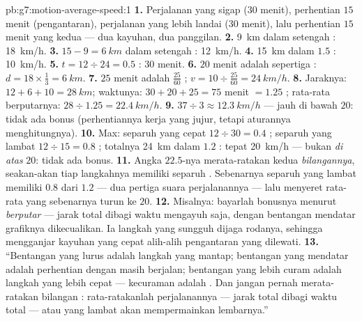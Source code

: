 \begin{solution}{pb:g7:motion-average-speed:1}
\textbf{1.} Perjalanan yang sigap ($30$ menit), perhentian $15$ menit
(pengantaran), perjalanan yang lebih landai ($30$ menit), lalu
perhentian $15$ menit yang kedua --- dua kayuhan, dua panggilan.
\textbf{2.} \qty{9}{km} dalam setengah : \qty{18}{km/h}.
\textbf{3.} $15 - 9 = \qty{6}{km}$ dalam setengah :
\qty{12}{km/h}.
\textbf{4.} \qty{15}{km} dalam $1.5$ : \qty{10}{km/h}.
\textbf{5.} $t = 12 \div 24 = 0.5$ : $30$ menit.
\textbf{6.} $20$ menit adalah sepertiga : $d = 18 \times
\tfrac{1}{3} = \qty{6}{km}$.
\textbf{7.} $25$ menit adalah $\tfrac{25}{60}$ ; $v = 10
\div \tfrac{25}{60} = \qty{24}{km/h}$.
\textbf{8.} Jaraknya: $12 + 6 + 10 = \qty{28}{km}$; waktunya:
$30 + 20 + 25 = 75$ menit $= 1.25$ ; rata-rata berputarnya:
$28 \div 1.25 = \qty{22.4}{km/h}$.
\textbf{9.} $37 \div 3 \approx \qty{12.3}{km/h}$ --- jauh di bawah
$20$: tidak ada bonus (perhentiannya kerja yang jujur, tetapi
aturannya menghitungnya).
\textbf{10.} Max: separuh yang cepat $12 \div 30 = 0.4$ ; separuh
yang lambat $12 \div 15 = 0.8$ ; totalnya \qty{24}{km} dalam $1.2$
: tepat \qty{20}{km/h} --- bukan \emph{di atas} $20$: tidak ada
bonus.
\textbf{11.} Angka $22.5$-nya merata-ratakan kedua \emph{bilangannya},
seakan-akan tiap langkahnya memiliki separuh . Sebenarnya
separuh yang lambat memiliki $0.8$ dari $1.2$  --- dua pertiga
suara perjalanannya --- lalu menyeret rata-rata yang sebenarnya turun
ke $20$.
\textbf{12.} Misalnya: bayarlah bonusnya menurut 
\emph{berputar} --- jarak total dibagi waktu mengayuh saja, dengan
bentangan mendatar grafiknya dikecualikan. Ia  langkah yang
sungguh dijaga rodanya, sehingga mengganjar kayuhan yang cepat
alih-alih pengantaran yang dilewati.
\textbf{13.} ``Bentangan yang lurus adalah langkah yang mantap;
bentangan yang mendatar adalah perhentian dengan  masih
berjalan; bentangan yang lebih curam adalah langkah yang lebih cepat
--- kecuraman adalah . Dan jangan pernah merata-ratakan
bilangan : rata-ratakanlah perjalanannya --- jarak total dibagi
waktu total --- atau  yang lambat akan mempermainkan lembarnya.''
\end{solution}
